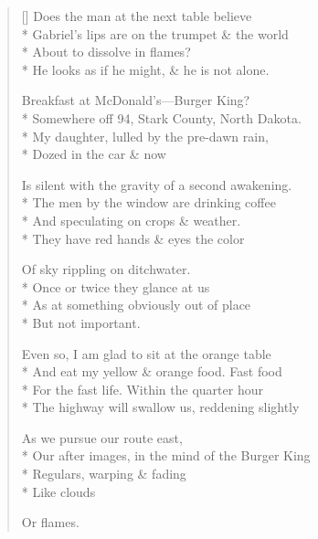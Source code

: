 \label{ch:main_street}
\settowidth{\versewidth}{Our after images, in the mind of the Burger King }
\begin{verse}[\versewidth]
Does the man at the next table believe\\*
Gabriel's lips are on the trumpet \& the world\\*
About to dissolve in flames?\\*
He looks as if he might, \& he is not alone.

Breakfast at McDonald's---Burger King?\\*
Somewhere off 94, Stark County, North Dakota.\\*
My daughter, lulled by the pre-dawn rain,\\*
Dozed in the car \& now

Is silent with the gravity of a second awakening.\\*
The men by the window are drinking coffee\\*
And speculating on crops \& weather.\\*
They have red hands \& eyes the color

Of sky rippling on ditchwater.\\*
Once or twice they glance at us\\*
As at something obviously out of place\\*
But not important.

Even so, I am glad to sit at the orange table\\*
And eat my yellow \& orange food. Fast food\\*
For the fast life. Within the quarter hour\\*
The highway will swallow us, reddening slightly

As we pursue our route east,\\*
Our after images, in the mind of the Burger King \\*
Regulars, warping \& fading\\*
Like clouds

Or flames.
\end{verse}
